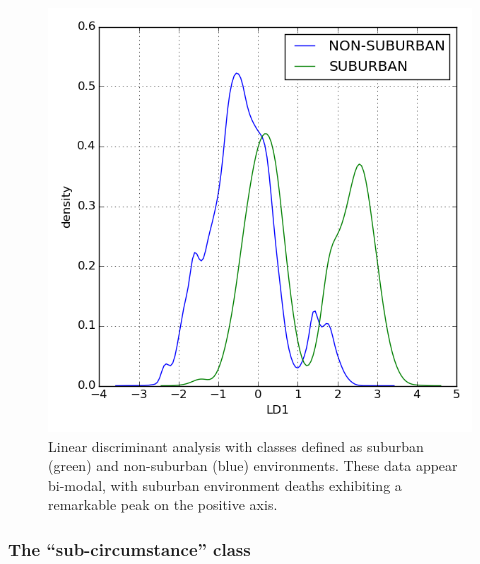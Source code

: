 \documentclass{evanarticle}
\begin{document}
\begin{figure}[H]
  \centering
    \includegraphics[width=\linewidth]{images/suburban/suburban.png}
  \caption{Linear discriminant analysis with classes defined as suburban (green) and non-suburban (blue) environments.  These data appear bi-modal, with suburban environment deaths exhibiting a remarkable peak on the positive axis.}
\end{figure}

\subsubsection{The ``sub-circumstance'' class}
\end{document}
